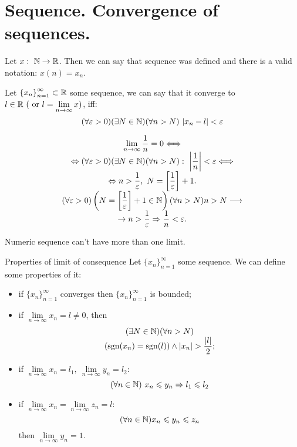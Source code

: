 \section{Sequence. Convergence of sequences.}
Let $x: \ \mathbb{N} \to \mathbb{R}$. Then we can say that sequence was defined and there is a valid notation: $x(n) = x_n$.

\begin{definition}{}{}
    Let $\left\{x_n\right\}_{n=1}^\infty \subset \mathbb{R}$ some sequence, we can say that it converge to $l \in \mathbb{R} \ (\text{ or } l = \lim\limits_{n\to \infty}x)$, iff:
    \[
        (\forall \varepsilon > 0) (\exists N \in \mathbb{N}) (\forall n > N) \ |x_n - l| < \varepsilon
    \] 
\end{definition}

\Ex 
\[
    \begin{array}{c}
       \lim\limits_{n\to \infty} \dfrac{1}{n} = 0 \Longleftrightarrow \\
       \Leftrightarrow (\forall \varepsilon > 0) (\exists N \in \mathbb{N})(\forall n > N): \ \left|\dfrac{1}{n} \right| < \varepsilon \Longleftrightarrow \\
       \Leftrightarrow n> \dfrac{1}{\varepsilon}, \ N = \left[ \dfrac{1}{\varepsilon}\right] + 1. \\ (\forall \varepsilon > 0) \left(N = \left[\dfrac{1}{\varepsilon}\right] + 1 \in \mathbb{N}\right) (\forall n > N) n > N \longrightarrow \\ \rightarrow n > 
       \dfrac{1}{\varepsilon} \Rightarrow \dfrac{1}{n} < \varepsilon.
    \end{array}  
\]
\begin{theorema}{}{}
  Numeric sequence can't have more than one limit.  
\end{theorema}

\begin{theorema}{Properties of limit of consequence}{}
    Let $\{x_n\}_{n=1}^\infty$ some sequence. We can define some properties of it:
    \begin{itemize}
        \item if $\{x_n\}_{n=1}^\infty$ converges then $\{x_n\}_{n=1}^\infty$ is bounded;
        \item if $\lim\limits_{n\to \infty} x_n = l \neq 0$, then 
        \useshortskip
        \[
            \begin{array}{c}
                (\exists N \in \mathbb{N}) (\forall n > N)\\
                (\operatorname{sgn} (x_n) = \operatorname{sgn}(l)) \wedge |x_n| > \dfrac{|l|}{2};
            \end{array}
        \]
        \item if $\lim\limits_{n\to \infty} x_n = l_1, \ \lim\limits_{n\to \infty} y_n = l_2$:
        \useshortskip
        \[
            (\forall n \in \mathbb{N}) \ x_n \leqslant y_n \Rightarrow l_1 \leqslant l_2  
        \]
        \item if $\lim\limits_{n\to \infty} x_n = \lim\limits_{n\to \infty} z_n = l$:
        \[
            (\forall n \in \mathbb{N}) x_n \leqslant y_n \leqslant z_n   
        \]
        then $\lim\limits_{n\to \infty} y_n = 1$.
    \end{itemize}
\end{theorema}

